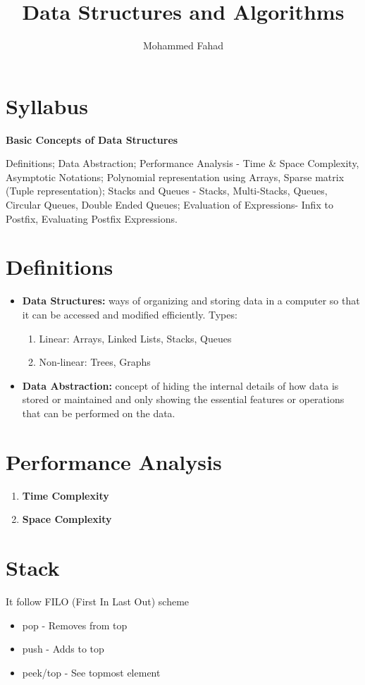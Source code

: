 \documentclass{article}
\title{Data Structures and Algorithms}
\author{Mohammed Fahad}
\begin{document}
\maketitle

\section*{Syllabus}

\textbf{Basic Concepts of Data Structures}

Definitions; Data Abstraction; Performance Analysis - Time \& Space
Complexity, Asymptotic Notations; Polynomial representation using
Arrays, Sparse matrix (Tuple representation); Stacks and Queues - Stacks,
Multi-Stacks, Queues, Circular Queues, Double Ended Queues; Evaluation
of Expressions- Infix to Postfix, Evaluating Postfix Expressions.

\section{Definitions}
\begin{itemize}
    \item \textbf{Data Structures:} ways of organizing and storing data in a computer so that it can be accessed and modified efficiently. Types:
    \begin{enumerate}
        \item Linear: Arrays, Linked Lists, Stacks, Queues
        \item Non-linear: Trees, Graphs
    \end{enumerate}

    \item \textbf{Data Abstraction:} concept of hiding the internal details of how data is stored or maintained and only showing the essential features or operations that can be performed on the data.
\end{itemize}

\section{Performance Analysis}
\begin{enumerate}
    \item \textbf{Time Complexity}
    \item \textbf{Space Complexity}
\end{enumerate}

\section{Stack}
It follow FILO (First In Last Out) scheme
\begin{itemize}
    \item pop - Removes from top
    \item push - Adds to top
    \item peek/top - See topmost element
\end{itemize}
\end{document}
